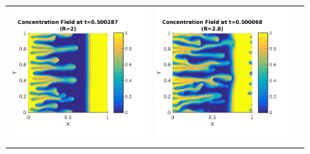 \documentclass{article}
\begin{document}
\begin{enumerate}
\begin{figure}[!ht]
\begin{tabular}{c c c}
\includegraphics[scale=0.5]{conc20_50.png} &
\includegraphics[scale=0.5]{conc28_50.png} \\

\end{tabular}
\end{figure}
\end{enumerate}
\end{document}
